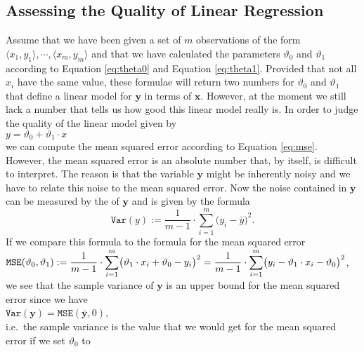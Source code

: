 \subsection{Assessing the Quality of Linear Regression}
Assume that we have been given a set of $m$ observations of the form $\langle x_1, y_1\rangle, \cdots, \langle x_m, y_m\rangle$  
and that we have calculated the parameters $\vartheta_0$ and $\vartheta_1$ according to Equation
\ref{eq:theta0} and Equation \ref{eq:theta1}.  Provided that not all $x_i$ have the same value, these
formulae will return two numbers for $\vartheta_0$ and $\vartheta_1$ that define a linear model for
$\mathbf{y}$ in terms of $\mathbf{x}$.  However, at the moment we still lack a number that tells us how good
this linear model really is.  In order to judge the quality of the linear model given by 
\\[0.2cm]
\hspace*{1.3cm}
$y = \vartheta_0 + \vartheta_1 \cdot x$
\\[0.2cm]
we can compute the mean squared error according to Equation \ref{eq:mse}.  However, the mean squared error 
is an absolute number that, by itself, is difficult to interpret.  The reason is that the variable $\mathbf{y}$ might be
inherently noisy and we have to relate this noise to the mean squared error.  Now the noise contained in $\mathbf{y}$
can be measured by the   of $\mathbf{y}$ and is given by the formula
\begin{equation}
  \label{eq:var}
  \mathtt{Var}(y) := \frac{1}{m-1} \cdot \sum\limits_{i=1}^m \bigl(y_i - \bar{y}\bigr)^2.
\end{equation}
If we compare this formula to the formula for the mean squared error
\\[0.2cm]
\hspace*{1.3cm}
$\displaystyle\mathtt{MSE}(\vartheta_0, \vartheta_1) := 
    \frac{1}{m-1} \cdot\sum\limits_{i=1}^m \bigl(\vartheta_1 \cdot x_i + \vartheta_0 - y_i\bigr)^2
=   \frac{1}{m-1} \cdot\sum\limits_{i=1}^m \bigl(y_i - \vartheta_1 \cdot x_i - \vartheta_0\bigr)^2
$,
\\[0.2cm]
we see that the sample variance of $\mathbf{y}$ is an upper bound for the mean squared error since we have
\\[0.2cm]
\hspace*{1.3cm}
$\mathtt{Var}(\mathbf{y}) = \mathtt{MSE}(\bar{\mathbf{y}}, 0)$,
\\[0.2cm]
i.e.~the sample variance is the value that we would get for the mean squared error if we set $\vartheta_0$ to
